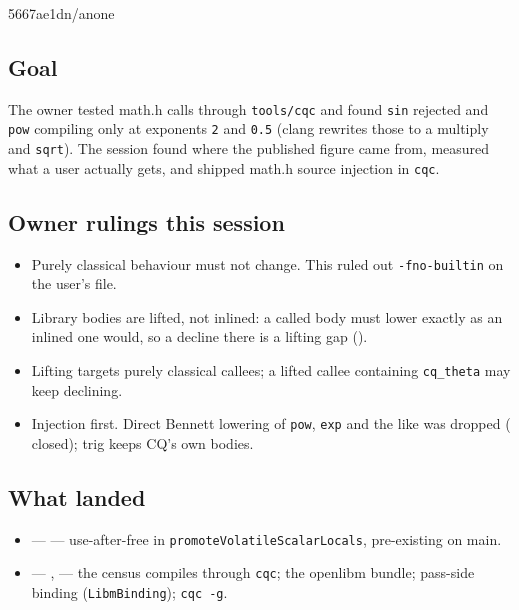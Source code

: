 %
  {5667ae1d}{n/a}{none}

\subsection*{Goal}
The owner tested math.h calls through \texttt{tools/cqc} and found \texttt{sin} rejected and
\texttt{pow} compiling only at exponents \texttt{2} and \texttt{0.5} (clang rewrites those to a
multiply and \texttt{sqrt}). The session found where the published figure came from, measured
what a user actually gets, and shipped math.h source injection in \texttt{cqc}.

\subsection*{Owner rulings this session}
\begin{itemize}
  \item Purely classical behaviour must not change. This ruled out \texttt{-fno-builtin} on the
  user's file.
  \item Library bodies are lifted, not inlined: a called body must lower exactly as an inlined
  one would, so a decline there is a lifting gap ().
  \item Lifting targets purely classical callees; a lifted callee containing \texttt{cq\_theta}
  may keep declining.
  \item Injection first. Direct Bennett lowering of \texttt{pow}, \texttt{exp} and the like was
  dropped ( closed); trig keeps CQ's own bodies.
\end{itemize}

\subsection*{What landed}
\begin{itemize}
  \item {} ---  --- use-after-free in
  \texttt{promoteVolatileScalarLocals}, pre-existing on main.
  \item {} --- ,  --- the census compiles through
  \texttt{cqc}; the openlibm bundle; pass-side binding (\texttt{LibmBinding}); \texttt{cqc -g}.
\end{itemize}

